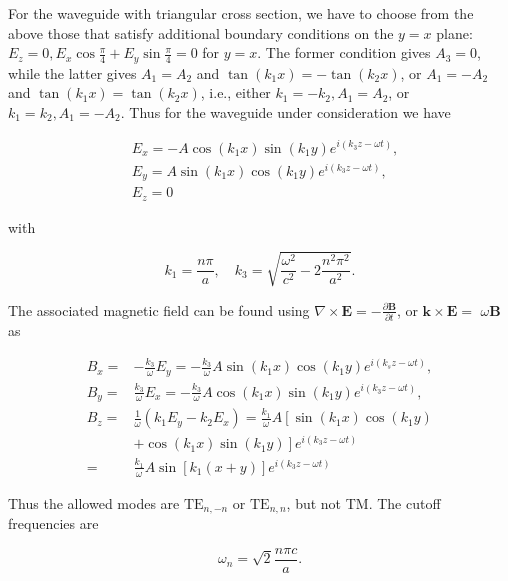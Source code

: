 \documentclass[10pt]{article}
\begin{document}
For the waveguide with triangular cross section, we have to choose from the above those that satisfy additional boundary conditions on the $y=x$ plane: $E_{z}=0, E_{x} \cos \frac{\pi}{4}+E_{y} \sin \frac{\pi}{4}=0$ for $y=x$. The former condition gives $A_{3}=0$, while the latter gives $A_{1}=A_{2}$ and $\tan \left(k_{1} x\right)=-\tan \left(k_{2} x\right)$, or $A_{1}=-A_{2}$ and $\tan \left(k_{1} x\right)=\tan \left(k_{2} x\right)$, i.e., either $k_{1}=-k_{2}, A_{1}=A_{2}$, or $k_{1}=k_{2}, A_{1}=-A_{2}$. Thus for the waveguide under consideration we have

$$
\begin{aligned}
&E_{x}=-A \cos \left(k_{1} x\right) \sin \left(k_{1} y\right) e^{i\left(k_{3} z-\omega t\right)}, \\
&E_{y}=A \sin \left(k_{1} x\right) \cos \left(k_{1} y\right) e^{i\left(k_{3} z-\omega t\right)}, \\
&E_{z}=0
\end{aligned}
$$

with

$$
k_{1}=\frac{n \pi}{a}, \quad k_{3}=\sqrt{\frac{\omega^{2}}{c^{2}}-2 \frac{n^{2} \pi^{2}}{a^{2}}} .
$$

The associated magnetic field can be found using $\nabla \times \mathbf{E}=-\frac{\partial \mathbf{B}}{\partial t}$, or $\mathbf{k} \times \mathbf{E}=$ $\omega \mathbf{B}$ as

$$
\begin{aligned}
B_{x}=&-\frac{k_{3}}{\omega} E_{y}=-\frac{k_{3}}{\omega} A \sin \left(k_{1} x\right) \cos \left(k_{1} y\right) e^{i\left(k_{s} z-\omega t\right)}, \\
B_{y}=& \frac{k_{3}}{\omega} E_{x}=-\frac{k_{3}}{\omega} A \cos \left(k_{1} x\right) \sin \left(k_{1} y\right) e^{i\left(k_{3} z-\omega t\right)}, \\
B_{z}=& \frac{1}{\omega}\left(k_{1} E_{y}-k_{2} E_{x}\right)=\frac{k_{1}}{\omega} A\left[\sin \left(k_{1} x\right) \cos \left(k_{1} y\right)\right.\\
&\left.+\cos \left(k_{1} x\right) \sin \left(k_{1} y\right)\right] e^{i\left(k_{3} z-\omega t\right)} \\
=& \frac{k_{1}}{\omega} A \sin \left[k_{1}(x+y)\right] e^{i\left(k_{3} z-\omega t\right)}
\end{aligned}
$$

Thus the allowed modes are $\mathrm{TE}_{n,-n}$ or $\mathrm{TE}_{n, n}$, but not TM. The cutoff frequencies are

$$
\omega_{n}=\sqrt{2} \frac{n \pi c}{a} .
$$
\end{document}
